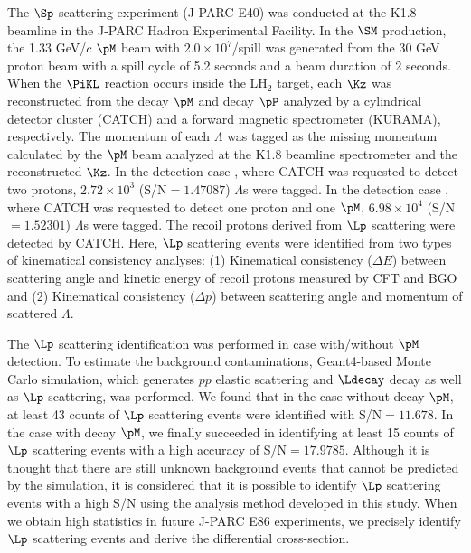 The $\Sp$ scattering experiment (J-PARC E40) \cite{Miwa-AIP2019} \cite{Miwa-JP2020} was conducted at the K1.8 beamline in the J-PARC Hadron Experimental Facility. In the $\SM$ production, the 1.33 GeV/$c$ $\pM$ beam with $2.0\times10^{7}$/spill was generated from the 30 GeV proton beam with a spill cycle of 5.2 seconds and a beam duration of 2 seconds. When the $\PiKL$ reaction occurs inside the LH$_{2}$ target, each $\Kz$ was reconstructed from the decay $\pM$ and decay $\pP$ analyzed by a cylindrical detector cluster (CATCH) and a forward magnetic spectrometer (KURAMA), respectively. The momentum of each $\Lambda$ was tagged as the missing momentum calculated by the $\pM$ beam analyzed at the K1.8 beamline spectrometer \cite{K1.8} and the reconstructed $\Kz$. In the detection case , where CATCH was requested to detect two protons, $2.72\times10^{3}$ (S/N$=1.47087$) $\Lambda$s were tagged. In the detection case , where CATCH was requested to detect one proton and one $\pM$, $6.98\times10^{4}$ (S/N$=1.52301$) $\Lambda$s were tagged. The recoil protons derived from $\Lp$ scattering were detected by CATCH. Here, $\Lp$ scattering events were identified from two types of kinematical consistency analyses: (1) Kinematical consistency ($\Delta E$) between scattering angle and kinetic energy of recoil protons measured by CFT and BGO and (2) Kinematical consistency  ($\Delta p$) between scattering angle and momentum of scattered $\Lambda$. 

The $\Lp$ scattering identification was performed in case  with/without $\pM$ detection. To estimate the background contaminations, Geant4-based Monte Carlo simulation, which generates $pp$ elastic scattering and $\Ldecay$ decay as well as $\Lp$ scattering, was performed. We found that in the case without decay $\pM$, at least 43 counts of $\Lp$ scattering events were identified with S/N$=11.678$. In the case with decay $\pM$, we finally succeeded in identifying at least 15 counts of $\Lp$ scattering events with a high accuracy of S/N$=17.9785$. Although it is thought that there are still unknown background events that cannot be predicted by the simulation, it is considered that it is possible to identify $\Lp$ scattering events with a high S/N using the analysis method developed in this study. When we obtain high statistics in future J-PARC E86 experiments, we precisely identify $\Lp$ scattering events and derive the differential cross-section.

